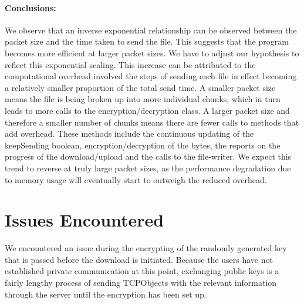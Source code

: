 \documentclass[12pt, a4paper]{article}
\begin{document}
\begin{center}
\end{center}



\paragraph{Conclusions:}
We observe that an inverse exponential relationship can be observed between the packet size and the time taken to send the file. This suggests that the program becomes more efficient at larger packet sizes. We have to adjust our hypothesis to reflect this exponential scaling. This increase can be attributed to the computational overhead involved the steps of sending each file in effect becoming a relatively smaller proportion of the total send time. A smaller packet size means the file is being broken up into more individual chunks, which in turn leads to more calls to the encryption/decryption class. A larger packet size and therefore a smaller number of chunks means there are fewer calls to methods that add overhead. These methods include the continuous updating of the keepSending boolean, encryption/decryption of the bytes, the reports on the progress of the download/upload and the calls to the file-writer. We expect this trend to reverse at truly large packet sizes, as the performance degradation due to memory usage will eventually start to outweigh the reduced overhead.

\section{Issues Encountered}
We encountered an issue during the encrypting of the randomly generated key that is passed before the download is initiated. Because the users have not established private communication at this point, exchanging public keys is a fairly lengthy process of sending TCPObjects with the relevant information through the server until the encryption has been set up.
\end{document}
